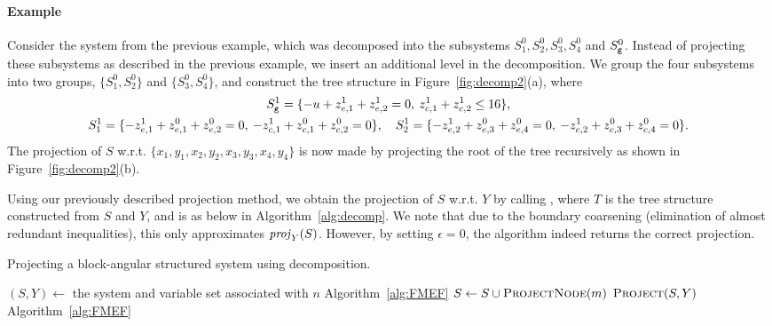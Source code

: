 \paragraph{Example}
Consider the system from the previous example, which was decomposed into the subsystems $S^0_1, S_2^0, S_3^0, S^0_4$ and $S^0_{\texttt{g}}$. Instead of projecting these subsystems as described in the previous example, we insert an additional level in the decomposition. We group the four subsystems into two groups, $\{S^0_1, S^0_2\}$ and $\{S^0_3, S^0_4\}$, and construct the tree structure in Figure~\ref{fig:decomp2}(a), where 
\small{\begin{gather*}
S_{\texttt{g}}^1 = \{-u + z^1_{e,1} + z^1_{e,2} = 0,\: z^1_{c,1} + z^1_{c,2} \leq 16 \},\\   
S^1_1=\{-z^1_{e,1} + z^0_{e,1} + z^0_{e,2} = 0,\: -z^1_{c,1} + z^0_{c,1} + z^0_{c,2} = 0\}, 
\quad S^1_2=\{-z^1_{e,2} +z^0_{e,3}+ z^0_{e,4} = 0,\: -z^1_{c,2} +z^0_{c,3}+ z^0_{c,4} = 0\}. 
\end{gather*}}
\normalsize{The projection of $S$ w.r.t. $\{x_1,y_1,x_2,y_2,x_3,y_3,x_4,y_4\}$ is now made by projecting the root of the tree recursively as shown in Figure~\ref{fig:decomp2}(b).}

Using our previously described projection method, we obtain the projection of $S$ w.r.t. $Y$ by calling , where $T$ is the tree structure constructed from $S$ and $Y$, and  is as below in Algorithm~\ref{alg:decomp}. We note that due to the boundary coarsening (elimination of almost redundant inequalities), this only approximates $\mathit{proj}_Y(S)$. However, by setting $\epsilon = 0$, the algorithm indeed returns the correct projection.

\begin{algorithm}
\caption{{Projecting a block-angular structured system using decomposition.}}
\label{alg:decomp}
\begin{algorithmic}
	\State $(S,Y)\gets$ the system and variable set associated with $n$
		\State \Return {}\Comment Algorithm~\ref{alg:FMEF}
	\Else
			\State $S \gets S\cup \Call{ProjectNode}{m}$ 
		\EndFor
		\State \Return $\Call{Project}{S, Y}$ \Comment Algorithm~\ref{alg:FMEF}
	\EndIf
\EndFunction
\end{algorithmic}
\end{algorithm}
%


